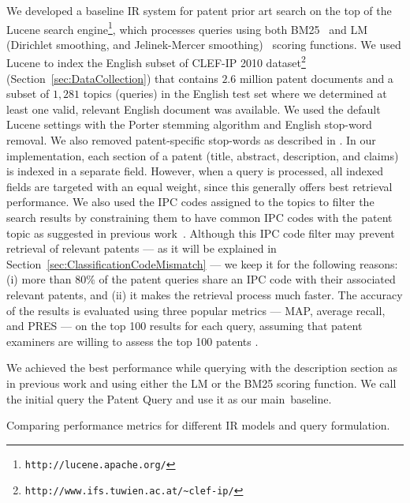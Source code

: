 We developed a baseline IR system for patent prior art search on the top of
the Lucene search engine\footnote{\texttt{http://lucene.apache.org/}}, which processes queries using both BM25~\citep{Robertson1993} and LM (Dirichlet
smoothing, and Jelinek-Mercer smoothing)~\citep{zhai2004study} scoring functions. %
We used Lucene to index the English subset of CLEF-IP 2010 dataset\footnote{\texttt{http://www.ifs.tuwien.ac.at/\textasciitilde{}clef-ip/}} 
(Section~\ref{sec:DataCollection}) 
that contains $2.6$ million patent documents and a subset of $1, 281$ topics (queries)
in the English test set where we determined at least one
valid, relevant English document was available.
We used the default Lucene settings with the Porter stemming algorithm \cite{Porter1980} and English stop-word removal. 
We also removed patent-specific stop-words as described in \cite{magdy2012toward}.
In our implementation, each section of a patent (title, abstract, description, and claims) is indexed in a separate field. However, when a query 
is processed, all indexed fields are targeted with an equal weight, since this generally
offers best retrieval performance. We also used the 
IPC codes assigned to the topics to filter
the search results by constraining them to have common IPC codes with
the patent topic as suggested in previous work~\citep{lopez2010patatras}.
Although this IPC code filter may prevent retrieval of relevant patents 
--- as it will be explained in Section~\ref{sec:ClassificationCodeMismatch} --- we
keep it for the following reasons: (i) more than 80\%
of the patent queries share an IPC code with their associated relevant
patents, and (ii) it makes the retrieval process much faster. The accuracy of the results is evaluated 
using three popular metrics --- MAP, average recall, and PRES --- on the top 100 results for each query, assuming that patent examiners 
are willing to assess the top 100 patents \citep{joho2010survey}. 

We achieved the best performance while querying with the description
section as in previous work \citep{xue2009transforming} and using
either the LM or the BM25 scoring function. 
We call the initial 
query the Patent Query and use it as our main~baseline.
\begin{savenotes}
\begin{table*}[t!]
  \begin{center}
  \caption{Comparing performance metrics for different IR models and query formulation.}
   
  \label{tab:IRmodels_Sections}
  \end{center}  
\end{table*}
\end{savenotes}

